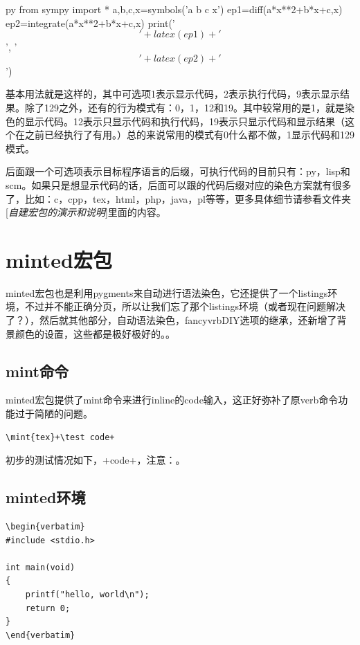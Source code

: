 \documentclass[11pt,oneside]{book}
\begin{document}
\begin{xverbatim}[129]{py}
from sympy import *
a,b,c,x=symbols('a b c x') 
ep1=diff(a*x**2+b*x+c,x)
ep2=integrate(a*x**2+b*x+c,x)
print('$$' + latex(ep1) + '$$', '$$' + latex(ep2) + '$$')
\end{xverbatim}

基本用法就是这样的，其中可选项1表示显示代码，2表示执行代码，9表示显示结果。除了129之外，还有的行为模式有：0，1，12和19。其中较常用的是1，就是染色的显示代码。12表示只显示代码和执行代码，19表示只显示代码和显示结果（这个在之前已经执行了有用。）总的来说常用的模式有0什么都不做，1显示代码和129模式。

后面跟一个可选项表示目标程序语言的后缀，可执行代码的目前只有：py，lisp和scm。如果只是想显示代码的话，后面可以跟的代码后缀对应的染色方案就有很多了，比如：c，cpp，tex，html，php，java，pl等等，更多具体细节请参看文件夹[\textit{自建宏包的演示和说明}]里面的内容。


\section{minted宏包}
minted宏包也是利用pygments来自动进行语法染色，它还提供了一个listings环境，不过并不能正确分页，所以让我们忘了那个listings环境（或者现在问题解决了？），然后就其他部分，自动语法染色，fancyvrbDIY选项的继承，还新增了背景颜色的设置，这些都是极好极好的。。

\subsection{mint命令}
minted宏包提供了mint命令来进行inline的code输入，这正好弥补了原verb命令功能过于简陋的问题。

\begin{Verbatim}
\mint{tex}+\test code+
\end{Verbatim}

初步的测试情况如下，+\test code+，注意：。

\subsection{minted环境}
\begin{Verbatim}
\begin{verbatim}
#include <stdio.h>

int main(void)
{
    printf("hello, world\n");
    return 0;
}
\end{verbatim}
\end{Verbatim}
\end{document}
